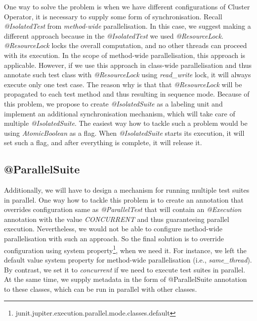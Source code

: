 One way to solve the problem is when we have different configurations of Cluster Operator, it is necessary to supply some form of synchronisation.
Recall \emph{@IsolatedTest} from \emph{method-wide} parallelisation.
In this case, we suggest making a different approach because in the \emph{@IsolatedTest} we used \emph{@ResourceLock}.
\emph{@ResourceLock} locks the overall computation, and no other threads can proceed with its execution.
In the scope of method-wide parallelisation, this approach is applicable.
However, if we use this approach in class-wide parallelisation and thus annotate such test class
with \emph{@ResourceLock} using \emph{read\_write} lock, it will always execute only one test case.
The reason why is that that \emph{@ResourceLock} will be propagated to each test method and thus resulting in sequence mode.
Because of this problem, we propose to create \emph{@IsolatedSuite} as a labeling unit and implement an additional synchronisation mechanism,
which will take care of multiple \emph{@IsolatedSuite}.
The easiest way how to tackle such a problem would be using \emph{AtomicBoolean} as a flag.
When \emph{@IsolatedSuite} starts its execution, it will set such a flag, and after everything is complete, it will release it.

\subsection{@ParallelSuite}
\label{05:parallelsuite}

Additionally, we will have to design a mechanism for running multiple test suites in parallel.
One way how to tackle this problem is to create an annotation that overrides configuration same as \emph{@ParallelTest}
that will contain an \emph{@Execution} annotation with the value \emph{CONCURRENT} and thus guaranteeing parallel execution.
Nevertheless, we would not be able to configure method-wide parallelisation with such an approach.
So the final solution is to override configuration using system property\footnote{junit.jupiter.execution.parallel.mode.classes.default},
when we need it.
For instance, we left the default value system property for method-wide parallelisation (i.e., \emph{same\_thread}).
By contrast, we set it to \emph{concurrent} if we need to execute test suites in parallel.
At the same time, we supply metadata in the form of @ParallelSuite annotation to these classes, which can be run in parallel with other classes.